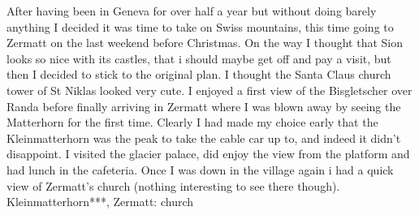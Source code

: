 After having been in Geneva for over half a year but without doing barely anything I decided it was time to take on Swiss mountains, this time going to Zermatt on the last weekend before Christmas. On the way I thought that Sion looks so nice with its castles, that i should maybe get off and pay a visit, but then I decided to stick to the original plan. I thought the Santa Claus church tower of St Niklas looked very cute. I enjoyed a first view of the Bisgletscher over Randa before finally arriving in Zermatt where I was blown away by seeing the Matterhorn for the first time. Clearly I had made my choice early that the Kleinmatterhorn was the peak to take the cable car up to, and indeed it didn't disappoint. I visited the glacier palace, did enjoy the view from the platform and had lunch in the cafeteria. Once I was down in the village again i had a quick view of Zermatt's church (nothing interesting to see there though).\\

Kleinmatterhorn***, Zermatt: church